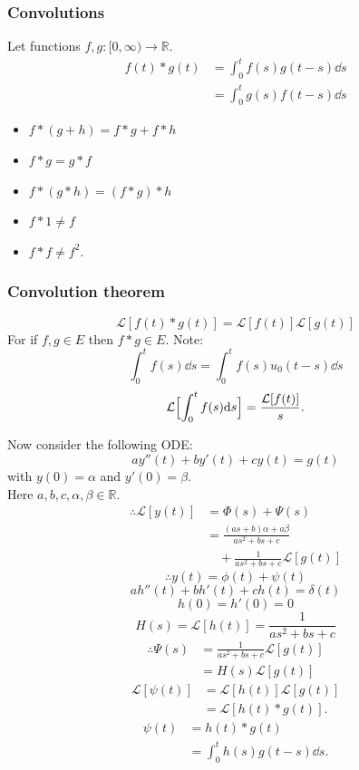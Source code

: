 \documentclass{article}
\begin{document}
\begin{multicols}{3}
\subsubsection*{Convolutions}
Let functions $f,g:[0,\infty)\rightarrow\mathbb{R}$.
\begin{align*}
    f(t)*g(t)
    &=\int_{0}^{t}f(s)g(t-s)\dd s \\
    &=\int_{0}^{t}g(s)f(t-s)\dd s
\end{align*}
\begin{itemize}
    \item $f*(g+h)=f*g+f*h$
    \item $f*g=g*f$
    \item $f*(g*h)=(f*g)*h$
    \item $f*1\neq f$
    \item $f*f\neq f^2$.
\end{itemize}

\subsubsection*{Convolution theorem}
$$\mathcal{L}[f(t)*g(t)]=\mathcal{L}[f(t)]\mathcal{L}[g(t)]$$
For if $f,g\in E$ then $f*g\in E$.
Note:
$$\int_{0}^{t}f(s)\dd s
=\int_{0}^{t}f(s)u_0(t-s)\dd s$$
$$\mathcal{L}\Bigl[
\int_{0}^{t}f(s)\dd s
\Bigr]=\frac{\mathcal{L}[f(t)]}{s}.$$

Now consider the following ODE:
$$ay''(t)+by'(t)+cy(t)=g(t)$$
with $y(0)=\alpha$ and $y'(0)=\beta$. \\
Here $a,b,c,\alpha,\beta\in\mathbb{R}$.
\begin{align*}
    \therefore\mathcal{L}[y(t)]
    &=\Phi(s)+\Psi(s) \\
    &=\frac{(as+b)\alpha+a\beta}
    {as^2+bs+c} \\
    &\quad+\frac{1}{as^2+bs+c}\mathcal{L}[g(t)]
\end{align*}
$$\therefore y(t)=\phi(t)+\psi(t)$$
$$ah''(t)+bh'(t)+ch(t)=\delta(t)$$
$$h(0)=h'(0)=0$$
$$H(s)=\mathcal{L}[h(t)]=\frac{1}{as^2+bs+c}$$
\begin{align*}
    \therefore\Psi(s)
    &=\frac{1}{as^2+bs+c}\mathcal{L}[g(t)] \\
    &=H(s)\mathcal{L}[g(t)]
\end{align*}
\begin{align*}
    \mathcal{L}[\psi(t)]
    &=\mathcal{L}[h(t)]\mathcal{L}[g(t)] \\
    &=\mathcal{L}[h(t)*g(t)].
\end{align*}
\begin{align*}
    \psi(t)
    &=h(t)*g(t) \\
    &=\int_{0}^{t}h(s)g(t-s)\dd s.
\end{align*}


\end{multicols}
\end{document}
